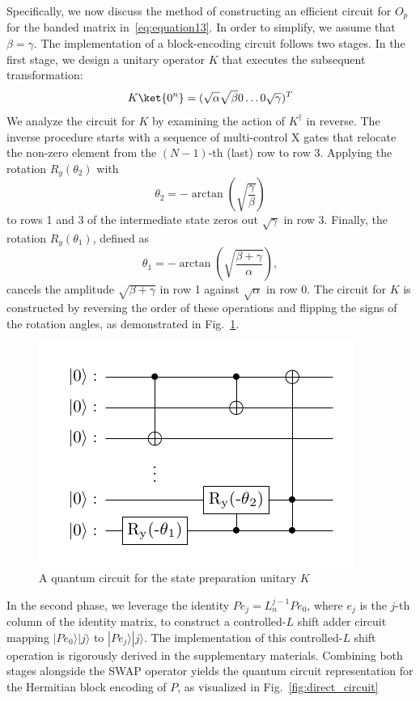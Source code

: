 \documentclass{article}
\begin{document}
    Specifically, we now discuss the method of constructing an efficient circuit for $O_p$ for the banded matrix in~\ref{eq:equation13}.
    In order to simplify, we assume that $\beta=\gamma$.
    The implementation of a block-encoding circuit follows two stages.
    In the first stage, we design a unitary operator $K$ that executes the subsequent transformation:
    \begin{equation}
        K\ket{0^n} = (\sqrt{\alpha}\sqrt{\beta}0\ldots0\sqrt{\gamma})^T\label{eq:equation27}
    \end{equation}
    We analyze the circuit for $ K $ by examining the action of $ K^\dagger $ in reverse. The inverse procedure starts with a sequence of multi-control X gates that relocate the non-zero element from the $ (N-1) $-th (last) row to row 3. Applying the rotation $ R_y(\theta_2) $ with
    $$
    \theta_2 = -\arctan\left( \sqrt{\frac{\gamma}{\beta}} \right)
    $$
    to rows 1 and 3 of the intermediate state zeros out $ \sqrt{\gamma} $ in row 3. Finally, the rotation $ R_y(\theta_1) $, defined as
    $$
    \theta_1 = -\arctan\left( \sqrt{\frac{\beta+\gamma}{\alpha}} \right),
    $$
    cancels the amplitude $ \sqrt{\beta+\gamma} $ in row 1 against $ \sqrt{\alpha} $ in row 0. The circuit for $ K $ is constructed by reversing the order of these operations and flipping the signs of the rotation angles, as demonstrated in Fig.~\ref{fig:K_circuit}.

    \begin{figure}[htbp]
        \centering
        \includegraphics{pdf/circuit_K}
        \caption{
            A quantum circuit for the state preparation unitary $K$
        }
        \label{fig:K_circuit}
    \end{figure}

    In the second phase, we leverage the identity $ Pe_j = L_n^{j-1} Pe_0 $, where $ e_j $ is the $ j $-th column of the identity matrix, to construct a controlled-$ L $ shift adder circuit mapping $ |Pe_0\rangle |j\rangle $ to $ |Pe_j\rangle |j\rangle $. The implementation of this controlled-$ L $ shift operation is rigorously derived in the supplementary materials. Combining both stages alongside the SWAP operator yields the quantum circuit representation for the Hermitian block encoding of $ P $, as visualized in Fig.~\ref{fig:direct_circuit}
\end{document}
